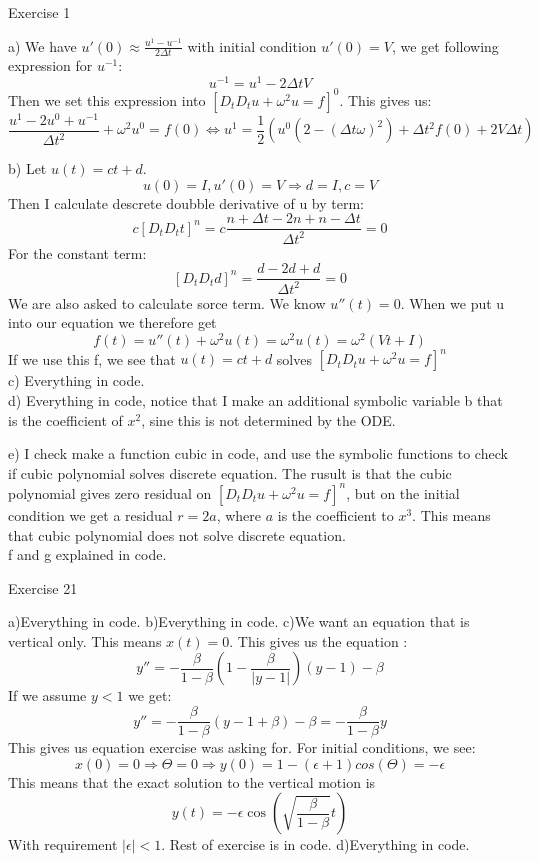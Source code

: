 \documentclass[11pt,a4paper]{report}
\begin{document}
Exercise 1

a) We have $u'(0) \approx \frac{u^1-u^{-1}}{2\Delta t} $ with initial condition $u'(0)=V$, we get following expression for $u^{-1}$: $$u^{-1} = u^1 -2\Delta t V$$ Then we set this expression into $[D_t D_t u + \omega^2 u =f]^0 $. This gives us: $$ \frac{u^1-2u^0+u^{-1}}{\Delta t^2} + \omega^2u^0 = f(0) \iff u^1 = \frac{1}{2}(u^0(2 - (\Delta t \omega)^2) + \Delta t^2f(0) +  2V\Delta t)$$


b) Let $u(t)=ct+d$. $$u(0)=I, u'(0)=V \Rightarrow d=I, c=V$$ Then I calculate descrete doubble derivative of u by term: $$c[D_t D_t t]^n = c\frac{n+\Delta t - 2n + n -\Delta t}{ \Delta t^2}= 0$$ For the constant term: $$ [D_t D_t d]^n = \frac{d - 2d + d }{ \Delta t^2}= 0$$ We are also asked to calculate sorce term. We know $u''(t)=0$. When we put u into our equation we therefore get $$f(t)=u''(t)+\omega^2u(t) = \omega^2u(t) = \omega^2(Vt+I)$$ If we use this f, we see that $u(t)=ct+d$ solves $[D_t D_t u + \omega^2 u =f]^n $
\\
c) Everything in code.
\\
d) Everything in code, notice that I make an additional symbolic variable b that is the coefficient of $x^2$, sine this is not determined by the ODE. 

e) I check make a function cubic in code, and use the symbolic functions to check if cubic polynomial solves discrete equation. The rusult is that the cubic polynomial gives zero residual on $[D_t D_t u + \omega^2 u =f]^n$, but on the initial condition we get a residual $r=2a$, where $a$ is the coefficient to $x^3$. This means that cubic polynomial does not solve discrete equation.
\\
f and g explained in code.



    
Exercise 21

a)Everything in code.
b)Everything in code.
c)We want an equation that is vertical only. This means $x(t)=0$. This gives us the equation : $$y''=-\frac{\beta}{1-\beta}(1-\frac{\beta}{|y-1|})(y-1)-\beta $$ If we assume $y<1$ we get:
$$y''=-\frac{\beta}{1-\beta}(y-1+\beta)-\beta= -\frac{\beta}{1-\beta}y$$ This gives us equation exercise was asking for. For initial conditions, we see: $$x(0)=0 \Rightarrow \Theta = 0 \Rightarrow y(0)=1-(\epsilon +1)cos(\Theta)=-\epsilon$$ This means that the exact solution to the vertical motion is $$y(t)=-\epsilon \cos(\sqrt{\frac{\beta}{1-\beta}}t)$$ With requirement $|\epsilon|<1$. Rest of exercise is in code.
d)Everything in code.
\end{document}
